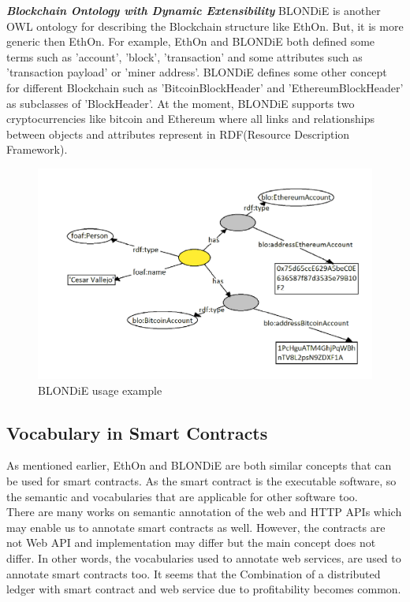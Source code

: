 \textbf{\textit{Blockchain Ontology with Dynamic Extensibility}}    
BLONDiE is another OWL ontology for describing the
Blockchain structure like EthOn. But, it is more generic then EthOn. For example, EthOn and BLONDiE both defined some terms such as 'account', 'block', 'transaction' and some attributes such as 'transaction payload' or 'miner address'. BLONDiE defines some other concept for different Blockchain such as 'BitcoinBlockHeader' and 'EthereumBlockHeader' as subclasses of 'BlockHeader'. At the moment, BLONDiE supports two cryptocurrencies like bitcoin and Ethereum where all links and relationships between objects and attributes represent in RDF(Resource Description Framework)\cite{Third}.
\begin{center}
	\begin{figure}[htb!]
		
		\begin{minipage}{0.55\linewidth}
			\centering
			\includegraphics[width=1.75\textwidth]{images/chap02_BLONDiE.png}
		\end{minipage}
		\caption[BLONDiE]{BLONDiE usage example\cite{Hector}}
		
		
	\end{figure}
	
\end{center}
\subsection{Vocabulary in Smart Contracts}
As mentioned earlier, EthOn and BLONDiE are both similar concepts that can be used for smart contracts. As the smart contract is the executable software, so the semantic and vocabularies that are applicable for other software too.\\
There are many works on semantic annotation of the web and HTTP APIs which may enable us to annotate smart contracts as well. However, the contracts are not Web API and implementation may differ but the main concept does not differ. In other words, the vocabularies used to annotate web services, are used to annotate smart contracts too. It seems that the Combination of a distributed ledger with smart contract and web service due to profitability becomes common\cite{Third}.

